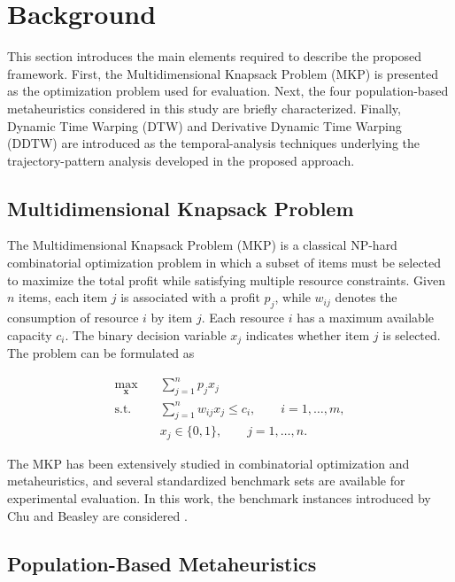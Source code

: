 \documentclass[journal,article,submit,moreauthors]{Definitions/mdpi}
\begin{document}
\section{Background}

This section introduces the main elements required to describe the proposed
framework. First, the Multidimensional Knapsack Problem (MKP) is presented as
the optimization problem used for evaluation. Next, the four population-based
metaheuristics considered in this study are briefly characterized. Finally,
Dynamic Time Warping (DTW) and Derivative Dynamic Time Warping (DDTW) are
introduced as the temporal-analysis techniques underlying the trajectory-pattern
analysis developed in the proposed approach.

\subsection{Multidimensional Knapsack Problem}

The Multidimensional Knapsack Problem (MKP) is a classical NP-hard
combinatorial optimization problem in which a subset of items must be selected
to maximize the total profit while satisfying multiple resource constraints.
Given $n$ items, each item $j$ is associated with a profit $p_j$, while
$w_{ij}$ denotes the consumption of resource $i$ by item $j$. Each resource
$i$ has a maximum available capacity $c_i$. The binary decision variable
$x_j$ indicates whether item $j$ is selected. The problem can be formulated
as

\begin{equation}
\begin{aligned}
\max_{\mathbf{x}} \quad
    & \sum_{j=1}^{n} p_j x_j \\
\text{s.t.} \quad
    & \sum_{j=1}^{n} w_{ij}x_j \leq c_i,
      \qquad i=1,\ldots,m, \\
    & x_j \in \{0,1\},
      \qquad j=1,\ldots,n.
\end{aligned}
\end{equation}

The MKP has been extensively studied in combinatorial optimization and
metaheuristics, and several standardized benchmark sets are available for
experimental evaluation. In this work, the benchmark instances introduced
by Chu and Beasley are considered \cite{chu1998genetic}.

\subsection{Population-Based Metaheuristics}
\end{document}
